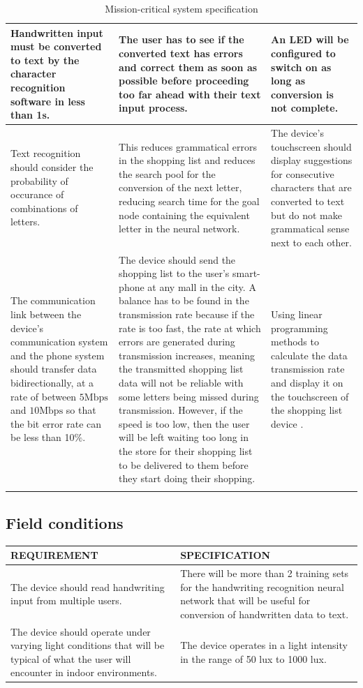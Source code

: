 {\begin{center}
\begin{longtable}{|p{5cm}|p{5cm}|p{5cm}|}
		\hline
		Handwritten input must be converted to text by the character recognition software in less than 1s.
		&
		The user has to see if the converted text has errors and correct them as soon as possible before proceeding too far ahead with their text input process.
		& 
		An LED will be configured to switch on as long as conversion is not complete.\\
		\hline
		Text recognition should consider the probability of occurance of combinations of letters.
		&
		This reduces grammatical errors in the shopping list and reduces the search pool for the conversion of the next letter, reducing search time for the goal node containing the equivalent letter in the neural network.
		& 
		The device's touchscreen should display suggestions for consecutive characters that are converted to text but do not make grammatical sense next to each other.\\
		\hline
		The communication link between the device's communication system and the phone system should transfer data bidirectionally, at a rate of between $5 \textrm{Mbps}$ and  $10 \textrm{Mbps}$ so that the bit error rate can be less than 10$\%$. 
		& 
		The device should send the shopping list to the user's smart-phone at any mall in the city. A balance has to be found in the transmission rate because if the rate is too fast, the rate at which errors are generated during transmission increases, meaning the transmitted shopping list data will not be reliable with some letters being missed during transmission. However, if the speed is too low, then the user will be left waiting too long in the store for their shopping list to be delivered to them before they start doing their shopping.
		&
		Using linear programming methods to calculate the data transmission rate and display it on the touchscreen of the shopping list device \cite{Shannon:A_Mathematical_Theory_of_Communications}.\\
		\hline
		\caption{Mission-critical system specification}
	\end{longtable}
\end{center}
\newpage
\subsection{Field conditions}
\begin{center}
	\begin{longtable}{|p{7.5cm}|p{7.5cm}|}
		\hline
		\textbf{REQUIREMENT} &
		\textbf{SPECIFICATION} \\
		\hline
		The device should read handwriting input from multiple users. 
		&
		There will be more than 2 training sets for the handwriting recognition neural network that will be useful for conversion of handwritten data to text.   
		\\
		\hline
		The device should operate under varying light conditions that will be typical of what the user will encounter in indoor environments.
		&
		The device operates in a light intensity in the range of 50 lux  to 1000 lux.
		\\
		\hline
		

\end{longtable}
\end{center}}
